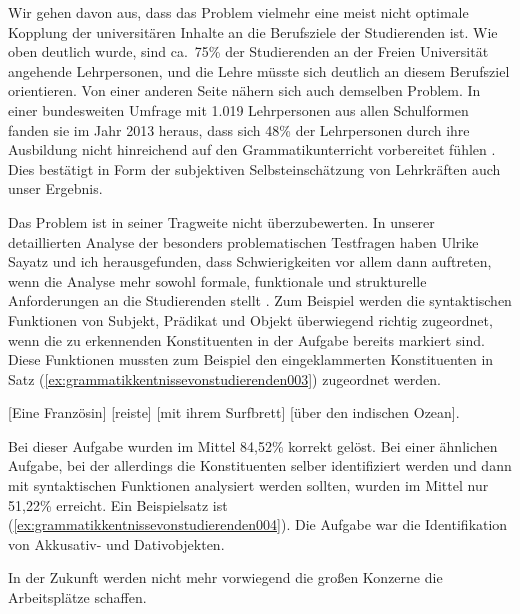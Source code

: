 Wir gehen davon aus, dass das Problem vielmehr eine meist nicht optimale Kopplung der universitären Inhalte an die Berufsziele der Studierenden ist.
Wie oben deutlich wurde, sind ca.\ 75\% der Studierenden an der Freien Universität angehende Lehrpersonen, und die Lehre müsste sich deutlich an diesem Berufsziel orientieren.
Von einer anderen Seite nähern sich auch \citet{TopalovicDuenschede2014} demselben Problem.
In einer bundesweiten Umfrage mit 1.019 Lehrpersonen aus allen Schulformen fanden sie im Jahr 2013 heraus, dass sich 48\% der Lehrpersonen durch ihre Ausbildung nicht hinreichend auf den Grammatikunterricht vorbereitet fühlen \citep[76--77]{TopalovicDuenschede2014}.
Dies bestätigt in Form der subjektiven Selbsteinschätzung von Lehrkräften auch unser Ergebnis.

Das Problem ist in seiner Tragweite nicht überzubewerten.
In unserer detaillierten Analyse der besonders problematischen Testfragen haben Ulrike Sayatz und ich herausgefunden, dass Schwierigkeiten vor allem dann auftreten, wenn die Analyse mehr sowohl formale, funktionale und strukturelle Anforderungen an die Studierenden stellt \citep[234--239]{SchaeferSayatz2017a}.
Zum Beispiel werden die syntaktischen Funktionen von Subjekt, Prädikat und Objekt überwiegend richtig zugeordnet, wenn die zu erkennenden Konstituenten in der Aufgabe bereits markiert sind.
Diese Funktionen mussten zum Beispiel den eingeklammerten Konstituenten in Satz (\ref{ex:grammatikkentnissevonstudierenden003}) zugeordnet werden.

\begin{exe}
  \ex\label{ex:grammatikkentnissevonstudierenden003} [Eine Französin] [reiste] [mit ihrem Surfbrett] [über den indischen Ozean].
\end{exe}

Bei dieser Aufgabe wurden im Mittel 84,52\% korrekt gelöst.
Bei einer ähnlichen Aufgabe, bei der allerdings die Konstituenten selber identifiziert werden und dann mit syntaktischen Funktionen analysiert werden sollten, wurden im Mittel nur 51,22\% erreicht.
Ein Beispielsatz ist (\ref{ex:grammatikkentnissevonstudierenden004}).
Die Aufgabe war die Identifikation von Akkusativ- und Dativobjekten.

\begin{exe}
  \ex\label{ex:grammatikkentnissevonstudierenden004} In der Zukunft werden nicht mehr vorwiegend die großen Konzerne die Arbeitsplätze schaffen.
\end{exe}

